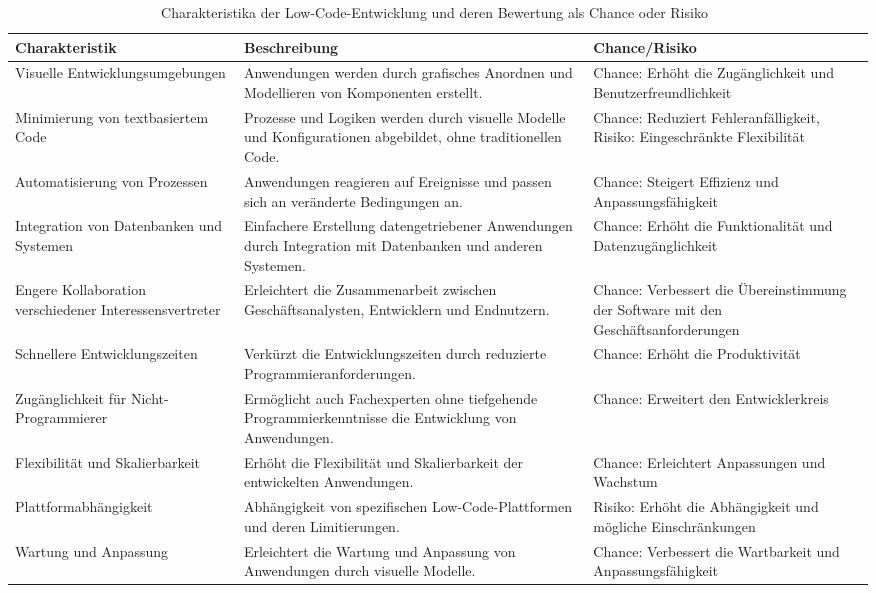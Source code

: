 \begin{table}[h!]
    \centering
    \begin{tabular}{|p{4cm}|p{6cm}|p{4cm}|}
    \hline
    \textbf{Charakteristik} & \textbf{Beschreibung} & \textbf{Chance/Risiko} \\
    \hline
    Visuelle Entwicklungsumgebungen & Anwendungen werden durch grafisches Anordnen und Modellieren von Komponenten erstellt. & Chance: Erhöht die Zugänglichkeit und Benutzerfreundlichkeit \\
    \hline
    Minimierung von textbasiertem Code & Prozesse und Logiken werden durch visuelle Modelle und Konfigurationen abgebildet, ohne traditionellen Code. & Chance: Reduziert Fehleranfälligkeit, Risiko: Eingeschränkte Flexibilität \\
    \hline
    Automatisierung von Prozessen & Anwendungen reagieren auf Ereignisse und passen sich an veränderte Bedingungen an. & Chance: Steigert Effizienz und Anpassungsfähigkeit \\
    \hline
    Integration von Datenbanken und Systemen & Einfachere Erstellung datengetriebener Anwendungen durch Integration mit Datenbanken und anderen Systemen. & Chance: Erhöht die Funktionalität und Datenzugänglichkeit \\
    \hline
    Engere Kollaboration verschiedener Interessensvertreter & Erleichtert die Zusammenarbeit zwischen Geschäftsanalysten, Entwicklern und Endnutzern. & Chance: Verbessert die Übereinstimmung der Software mit den Geschäftsanforderungen \\
    \hline
    Schnellere Entwicklungszeiten & Verkürzt die Entwicklungszeiten durch reduzierte Programmieranforderungen. & Chance: Erhöht die Produktivität \\
    \hline
    Zugänglichkeit für Nicht-Programmierer & Ermöglicht auch Fachexperten ohne tiefgehende Programmierkenntnisse die Entwicklung von Anwendungen. & Chance: Erweitert den Entwicklerkreis \\
    \hline
    Flexibilität und Skalierbarkeit & Erhöht die Flexibilität und Skalierbarkeit der entwickelten Anwendungen. & Chance: Erleichtert Anpassungen und Wachstum \\
    \hline
    Plattformabhängigkeit & Abhängigkeit von spezifischen Low-Code-Plattformen und deren Limitierungen. & Risiko: Erhöht die Abhängigkeit und mögliche Einschränkungen \\
    \hline
    Wartung und Anpassung & Erleichtert die Wartung und Anpassung von Anwendungen durch visuelle Modelle. & Chance: Verbessert die Wartbarkeit und Anpassungsfähigkeit \\
    \hline
    \end{tabular}
    \caption{Charakteristika der Low-Code-Entwicklung und deren Bewertung als Chance oder Risiko~\cite{Bock_2021, Shridhar_2021, Alamin_2021}}
    \label{tab:lowcode_characteristics}
\end{table}


